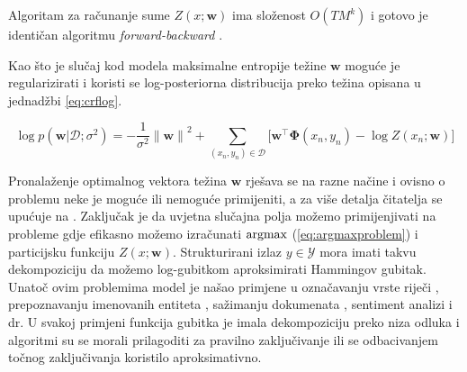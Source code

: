 Algoritam za računanje sume $Z(x; \mathbf{w})$ ima složenost $O(T M ^ k)$ i
gotovo je identičan algoritmu \textit{forward-backward}
\citep{baum1966statistical}.

Kao što je slučaj kod modela maksimalne entropije težine $\mathbf{w}$ moguće je
regularizirati i koristi se log-posteriorna distribucija preko težina opisana u
jednadžbi \ref{eq:crflog}.

\begin{equation}\label{eq:crflog}
  \log p(\mathbf{w} | \mathcal{D}; \sigma^2) = -\frac{1}{\sigma^2} {\lVert\mathbf{w}\lVert}^2 + \sum_{(x_n, y_n) \in \mathcal{D}} \bigg[ \mathbf{w}^\top \mathbf{\Phi}(x_n, y_n) - \log Z(x_n; \mathbf{w}) \bigg]
\end{equation}

Pronalaženje optimalnog vektora težina $\mathbf{w}$ rješava se na razne načine
\citep{lafferty2001conditional, sha2003shallow, sokolovska2010efficient} i
ovisno o problemu neke je moguće ili nemoguće primijeniti, a za više detalja
čitatelja se upućuje na \citep{wallach2004conditional, sutton2006introduction}.
Zaključak je da uvjetna slučajna polja možemo primijenjivati na probleme gdje
efikasno možemo izračunati $\operatorname*{argmax}$ (\ref{eq:argmaxproblem}) i particijsku
funkciju $Z(x; \mathbf{w})$. Strukturirani izlaz $y \in \mathcal{Y}$ mora imati
takvu dekompoziciju da možemo log-gubitkom aproksimirati Hammingov gubitak.
Unatoč ovim problemima model je našao primjene u označavanju vrste riječi
\citep{lafferty2001conditional}, prepoznavanju imenovanih entiteta
\citep{mccallum2003early, settles2004biomedical}, sažimanju dokumenata
 \citep{shen2007document}, sentiment analizi
\citep{mcdonald2007structured} i dr. U svakoj primjeni funkcija gubitka je imala
dekompoziciju preko niza odluka i algoritmi su se morali prilagoditi za pravilno
zaključivanje ili se odbacivanjem točnog zaključivanja koristilo aproksimativno.

